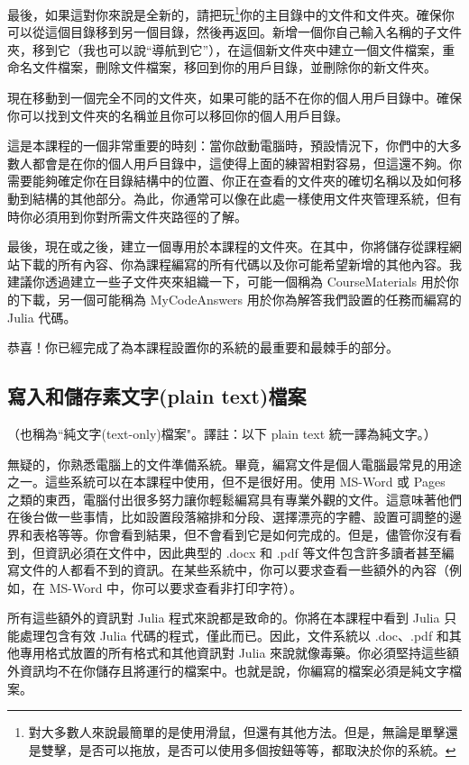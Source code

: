 \documentclass[]{article}
\begin{document}
最後，如果這對你來說是全新的，請把玩\footnote{對大多數人來說最簡單的是使用滑鼠，但還有其他方法。但是，無論是單擊還是雙擊，是否可以拖放，是否可以使用多個按鈕等等，都取決於你的系統。}你的主目錄中的文件和文件夾。確保你可以從這個目錄移到另一個目錄，然後再返回。新增一個你自己輸入名稱的子文件夾，移到它（我也可以說``導航到它''），在這個新文件夾中建立一個文件檔案，重命名文件檔案，刪除文件檔案，移回到你的用戶目錄，並刪除你的新文件夾。

現在移動到一個完全不同的文件夾，如果可能的話不在你的個人用戶目錄中。確保你可以找到文件夾的名稱並且你可以移回你的個人用戶目錄。

這是本課程的一個非常重要的時刻：當你啟動電腦時，預設情況下，你們中的大多數人都會是在你的個人用戶目錄中，這使得上面的練習相對容易，但這還不夠。你需要能夠確定你在目錄結構中的位置、你正在查看的文件夾的確切名稱以及如何移動到結構的其他部分。為此，你通常可以像在此處一樣使用文件夾管理系統，但有時你必須用到你對所需文件夾路徑的了解。

最後，現在或之後，建立一個專用於本課程的文件夾。在其中，你將儲存從課程網站下載的所有內容、你為課程編寫的所有代碼以及你可能希望新增的其他內容。我建議你透過建立一些子文件夾來組織一下，可能一個稱為 CourseMaterials 用於你的下載，另一個可能稱為 MyCodeAnswers 用於你為解答我們設置的任務而編寫的 Julia 代碼。

恭喜！你已經完成了為本課程設置你的系統的最重要和最棘手的部分。

\subsection*{寫入和儲存素文字(plain text)檔案}

（也稱為``純文字(text-only)檔案"。譯註：以下 plain text 統一譯為純文字。）

無疑的，你熟悉電腦上的文件準備系統。畢竟，編寫文件是個人電腦最常見的用途之一。這些系統可以在本課程中使用，但不是很好用。使用 MS-Word 或 Pages 之類的東西，電腦付出很多努力讓你輕鬆編寫具有專業外觀的文件。這意味著他們在後台做一些事情，比如設置段落縮排和分段、選擇漂亮的字體、設置可調整的邊界和表格等等。你會看到結果，但不會看到它是如何完成的。但是，儘管你沒有看到，但資訊必須在文件中，因此典型的 .docx 和 .pdf 等文件包含許多讀者甚至編寫文件的人都看不到的資訊。在某些系統中，你可以要求查看一些額外的內容（例如，在 MS-Word 中，你可以要求查看非打印字符）。

所有這些額外的資訊對 Julia 程式來說都是致命的。你將在本課程中看到 Julia 只能處理包含有效 Julia 代碼的程式，僅此而已。因此，文件系統以 .doc、.pdf 和其他專用格式放置的所有格式和其他資訊對 Julia 來說就像毒藥。你必須堅持這些額外資訊均不在你儲存且將運行的檔案中。也就是說，你編寫的檔案必須是純文字檔案。
\end{document}
